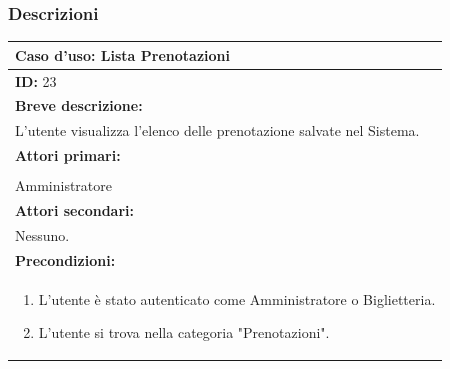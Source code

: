 \documentclass{article}
\begin{document}
            \subsubsection{Descrizioni}
                \begin{table}[H]
                    \begin{tabular}{|p{\linewidth}|}
                        \hline
                        \cellcolor{gray!100}
                        \color{white}
                        \centerline{\textbf{Caso d'uso:} Lista Prenotazioni} \\
                        \hline
                        \textbf{ID:} 23 \\
                        \hline
                        \cellcolor{gray!20}
                        \textbf{Breve descrizione:} \\
                        \cellcolor{gray!20}                        
                        L'utente visualizza l'elenco delle prenotazione salvate nel Sistema. \\
                        \hline
                        \textbf{Attori primari:} \\
                        \begin{minipage}{\linewidth}
                            Biglietteria \\
                            Amministratore
                        \end{minipage}
                        \vspace {-5pt} \\
                        \hline
                        \textbf{Attori secondari:} \\                        
                        Nessuno. \\
                        \hline
                        \cellcolor{gray!20}
                        \textbf{Precondizioni:} \\
                        \cellcolor{gray!20}
                        \begin{minipage}{\linewidth}
                            \begin{enumerate}
                                \item L'utente è stato autenticato come Amministratore o Biglietteria.
                                \item L'utente si trova nella categoria "Prenotazioni".
                            \end{enumerate}

\end{minipage}
\end{tabular}
\end{table}
\end{document}
